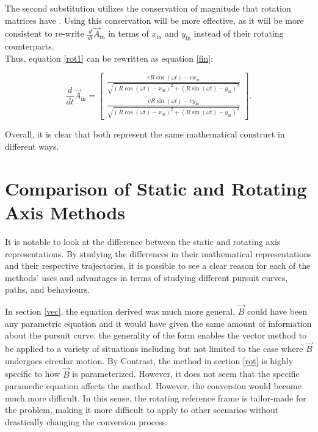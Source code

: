 \documentclass[pstricks, border=12pt]{article}
\begin{document}
The second substitution utilizes the conservation of magnitude that rotation matrices have \cite{weideman_2022}. Using this conservation will be more effective, as it will be more consistent to re-write $\frac{d}{dt}\Vec{A}_{\text{in}}$ in terms of $x_{\text{in}}$ and $y_{\text{in}}$ instead of their rotating counterparts.\\

Thus, equation \eqref{rot1} can be rewritten as equation \eqref{fin}:

\begin{equation}
    \frac{d}{dt}\Vec{A}_{\text{in}} = \begin{bmatrix}
        \frac{vR\cos(\omega t) - vx_{\text{in}}}{ \sqrt{(R\cos(\omega t) - x_{\text{in}})^2 + (R\sin(\omega t) - y_{\text{in}})^2}}\\
        \frac{vR\sin(\omega t) - vy_{\text{in}}}{ \sqrt{(R\cos(\omega t) - x_{\text{in}})^2 + (R\sin(\omega t) - y_{\text{in}})^2}}
    \end{bmatrix}.
    \label{fin}
\end{equation}

Overall, it is clear that both represent the same mathematical construct in different ways.


\section{Comparison of Static and Rotating Axis Methods}

It is notable to look at the difference between the static and rotating axis representations. By studying the differences in their mathematical representations and their respective trajectories, it is possible to see a clear reason for each of the methods' uses and advantages in terms of studying different pursuit curves, paths, and behaviours.

In section \ref{vec}, the equation derived was much more general, $\Vec{B}$ could have been any parametric equation and it would have given the same amount of information about the pursuit curve. the generality of the form enables the vector method to be applied to a variety of situations including but not limited to the case where $\Vec{B}$ undergoes circular motion. By Contrast, the method in section \ref{rot} is highly specific to how $\vec B$ is parameterized. However, it does not seem that the specific paramedic equation affects the method. However, the conversion would become much more difficult. In this sense, the rotating reference frame is tailor-made for the problem, making it more difficult to apply to other scenarios without drastically changing the conversion process.
\end{document}
